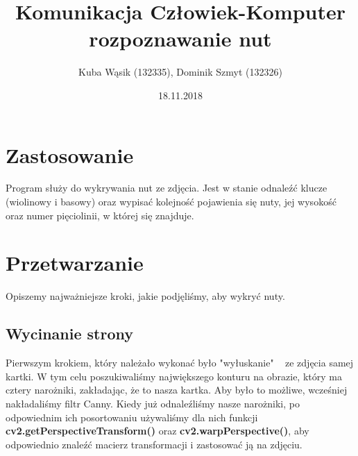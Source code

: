 \documentclass[11pt]{article}
\title{Komunikacja Człowiek-Komputer \newline rozpoznawanie nut}
\author{Kuba Wąsik (132335), Dominik Szmyt (132326)}
\date{18.11.2018}
\begin{document}
\maketitle

\section{Zastosowanie}


Program służy do wykrywania nut ze zdjęcia.
Jest w stanie odnaleźć klucze (wiolinowy i basowy) oraz wypisać kolejność pojawienia się nuty, jej wysokość oraz numer pięciolinii, w której się znajduje.  

\section{Przetwarzanie}

Opiszemy najważniejsze kroki, jakie podjęliśmy, aby wykryć nuty.

\subsection{Wycinanie strony}

Pierwszym krokiem, który należało wykonać było "wyłuskanie" ~ ze zdjęcia samej kartki. 
W tym celu poszukiwaliśmy największego konturu na obrazie, który ma cztery narożniki, zakładając, że to nasza kartka. 
Aby było to możliwe, wcześniej nakładaliśmy filtr Canny. 
Kiedy już odnaleźliśmy nasze narożniki, po odpowiednim ich posortowaniu używaliśmy dla nich funkcji \textbf{cv2.getPerspectiveTransform()}
oraz \textbf{cv2.warpPerspective()}, aby odpowiednio znaleźć macierz transformacji i zastosować ją na zdjęciu. 
\end{document}
